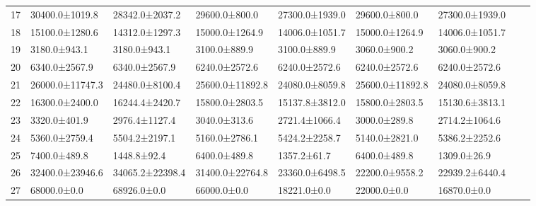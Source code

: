 \begin{tabular}{|r|l|l|l|l|l|l|l|l|}
  17 & 30400.0±1019.8 & 28342.0±2037.2 & 29600.0±800.0 & 27300.0±1939.0 & 29600.0±800.0 & 27300.0±1939.0 \\ 
  18 & 15100.0±1280.6 & 14312.0±1297.3 & 15000.0±1264.9 & 14006.0±1051.7 & 15000.0±1264.9 & 14006.0±1051.7 \\ 
  19 & 3180.0±943.1 & 3180.0±943.1 & 3100.0±889.9 & 3100.0±889.9 & 3060.0±900.2 & 3060.0±900.2 \\ 
  20 & 6340.0±2567.9 & 6340.0±2567.9 & 6240.0±2572.6 & 6240.0±2572.6 & 6240.0±2572.6 & 6240.0±2572.6 \\ 
  21 & 26000.0±11747.3 & 24480.0±8100.4 & 25600.0±11892.8 & 24080.0±8059.8 & 25600.0±11892.8 & 24080.0±8059.8 \\ 
  22 & 16300.0±2400.0 & 16244.4±2420.7 & 15800.0±2803.5 & 15137.8±3812.0 & 15800.0±2803.5 & 15130.6±3813.1 \\ 
  23 & 3320.0±401.9 & 2976.4±1127.4 & 3040.0±313.6 & 2721.4±1066.4 & 3000.0±289.8 & 2714.2±1064.6 \\ 
  24 & 5360.0±2759.4 & 5504.2±2197.1 & 5160.0±2786.1 & 5424.2±2258.7 & 5140.0±2821.0 & 5386.2±2252.6 \\ 
  25 & 7400.0±489.8 & 1448.8±92.4 & 6400.0±489.8 & 1357.2±61.7 & 6400.0±489.8 & 1309.0±26.9 \\ 
  26 & 32400.0±23946.6 & 34065.2±22398.4 & 31400.0±22764.8 & 23360.0±6498.5 & 22200.0±9558.2 & 22939.2±6440.4 \\ 
  27 & 68000.0±0.0 & 68926.0±0.0 & 66000.0±0.0 & 18221.0±0.0 & 22000.0±0.0 & 16870.0±0.0 \\ 
\end{tabular}
